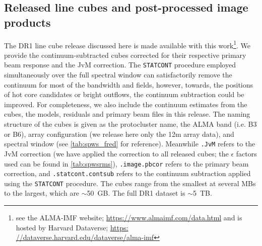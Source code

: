 \documentclass[longauth]{aa} %
\begin{document}
\subsection{Released line cubes and post-processed image products}
The DR1 line cube release discussed here is made available with this work\footnote{see the ALMA-IMF website; \url{https://www.almaimf.com/data.html} and is hosted by Harvard Dataverse; \url{https:
//dataverse.harvard.edu/dataverse/alma-imf}}. We provide the continuum-subtracted cubes corrected for their respective primary beam response and the JvM correction. The \texttt{STATCONT} procedure employed simultaneously over the full spectral window can satisfactorily remove the continuum for most of the bandwidth and fields, however, towards, the positions of hot core candidates or bright outflows, the continuum subtraction could be improved. 
For completeness, we also include the continuum estimates from the cubes, the models, residuals and primary beam files in this release. 
The naming structure of the cubes is given as the protocluster name, the ALMA band (i.e. B3 or B6), array configuration (we release here only the 12m array data), and spectral window (see \cref{tab:spws_fred} for reference). Meanwhile \texttt{.JvM} refers to the JvM correction (we have applied the correction to all released cubes; the $\epsilon$ factors used can be found in \cref{tab:spwsrms}), \texttt{.image.pbcor} refers to the primary beam correction, and \texttt{.statcont.contsub} refers to the continuum subtraction applied using the \texttt{STATCONT} procedure. The cubes range from the smallest at several MBs to the largest, which are $\sim$50~GB. The full DR1 dataset is $\sim$5~TB.
\end{document}
